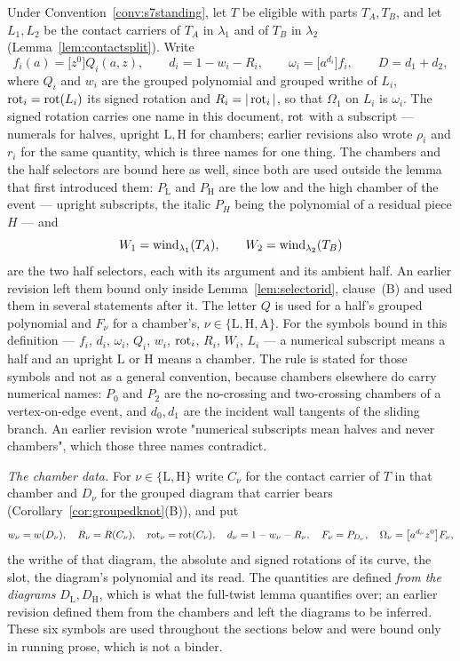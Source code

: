 \begin{definition}\label{def:markeddata}
Under Convention~\ref{conv:s7standing}, let $T$ be eligible with parts
$T_A,T_B$, and let
$L_1,L_2$ be the contact carriers of $T_A$ in $\lambda_1$ and of $T_B$ in
$\lambda_2$ (Lemma~\ref{lem:contactsplit}). Write
\[
   f_i(a)=\bigl[z^0\bigr]Q_{i}(a,z),\qquad
   d_i=1-w_i-R_i,\qquad
   \omega_i=\bigl[a^{d_i}\bigr]f_i,\qquad
   D=d_1+d_2,
\]
where $Q_i$ and $w_i$ are the grouped polynomial and grouped writhe of $L_i$,
$\operatorname{rot}_i=\operatorname{rot}(L_i)$ its signed rotation and $R_i=|\operatorname{rot}_i|$, so that $\Omega_1$ on
$L_i$ is $\omega_i$. The signed rotation carries one name in this document,
$\operatorname{rot}$ with a subscript --- numerals for halves, upright $\mathrm L,\mathrm H$
for chambers; earlier revisions also wrote $\rho_i$ and $r_i$ for the same
quantity, which is three names for one thing. The chambers and the half selectors are bound here as
well, since both are used outside the lemma that first introduced them:
$P_{\mathrm L}$ and $P_{\mathrm H}$ are the low and the high chamber of the
event --- upright subscripts, the italic $P_H$ being the polynomial of a
residual piece $H$ --- and
\[
   W_1=\operatorname{wind}_{\lambda_1}(T_A),\qquad W_2=\operatorname{wind}_{\lambda_2}(T_B)
\]
are the two half selectors, each with its argument and its ambient half. An
earlier revision left them bound only inside Lemma~\ref{lem:selectorid}, clause~(B) and used
them in several statements after it. The letter $Q$ is used for a half's grouped polynomial and
$F_\nu$ for a chamber's, $\nu\in\{\mathrm L,\mathrm H,\mathrm A\}$. For the
symbols bound in this definition --- $f_i$, $d_i$, $\omega_i$, $Q_i$, $w_i$,
$\operatorname{rot}_i$, $R_i$, $W_i$, $L_i$ --- a numerical subscript means a half and an
upright $\mathrm L$ or $\mathrm H$ means a chamber. The rule is stated for those
symbols and not as a general convention, because chambers elsewhere do carry
numerical names: $P_0$ and $P_2$ are the no-crossing and two-crossing chambers
of a vertex-on-edge event, and $d_0,d_1$ are the incident wall tangents of the
sliding branch. An earlier revision wrote "numerical subscripts mean halves and
never chambers", which those three names contradict.

\emph{The chamber data.} For $\nu\in\{\mathrm L,\mathrm H\}$ write $C_\nu$ for
the contact carrier of $T$ in that chamber and $D_\nu$ for the grouped diagram
that carrier bears (Corollary~\ref{cor:groupedknot}(B)), and put
\[
   w_\nu=w(D_\nu),\quad R_\nu=R(C_\nu),\quad \operatorname{rot}_\nu=\operatorname{rot}(C_\nu),\quad
   d_\nu=1-w_\nu-R_\nu,\quad F_\nu=P_{D_\nu},\quad
   \Omega_\nu=\bigl[a^{d_\nu}z^0\bigr]F_\nu,
\]
the writhe of that diagram, the absolute and signed rotations of its curve, the
slot, the diagram's polynomial and its read. The quantities are defined
\emph{from the diagrams} $D_{\mathrm L},D_{\mathrm H}$, which is what the
full-twist lemma quantifies over; an earlier revision defined them from the
chambers and left the diagrams to be inferred. These six symbols are used throughout the sections
below and were bound only in running prose, which is not a binder.


\end{definition}
